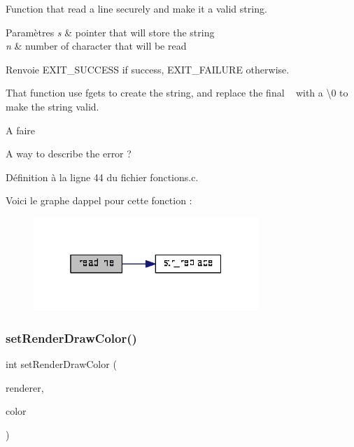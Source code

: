 Function that read a line securely and make it a valid string. 


\begin{DoxyParams}{Paramètres}
{\em s} & pointer that will store the string \\
\hline
{\em n} & number of character that will be read \\
\hline
\end{DoxyParams}
\begin{DoxyReturn}{Renvoie}
E\+X\+I\+T\+\_\+\+S\+U\+C\+C\+E\+SS if success, E\+X\+I\+T\+\_\+\+F\+A\+I\+L\+U\+RE otherwise.
\end{DoxyReturn}
That function use fgets to create the string, and replace the final \textquotesingle{}~\newline
\textquotesingle{} with a \textquotesingle{}\textbackslash{}0\textquotesingle{} to make the string valid. \begin{DoxyRefDesc}{A faire}
\item[\textbf{ A faire}]A way to describe the error ? \end{DoxyRefDesc}


Définition à la ligne 44 du fichier fonctions.\+c.

Voici le graphe d\textquotesingle{}appel pour cette fonction \+:
\nopagebreak
\begin{figure}[H]
\begin{center}
\leavevmode
\includegraphics[width=241pt]{fonctions_8c_afe286242e48f523265fd5fcdae3f7358_cgraph}
\end{center}
\end{figure}
\mbox{\label{fonctions_8c_ad8ec5206bc6a89f1b70d8895523b7919}} 
\subsubsection{set\+Render\+Draw\+Color()}
{\footnotesize\ttfamily int set\+Render\+Draw\+Color (\begin{DoxyParamCaption}\item[{S\+D\+L\+\_\+\+Renderer $\ast$}]{renderer,  }\item[{S\+D\+L\+\_\+\+Color $\ast$}]{color }\end{DoxyParamCaption})}




